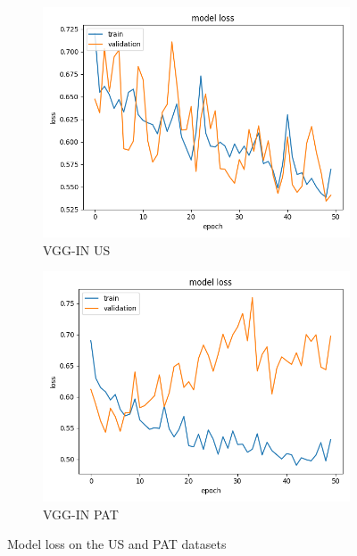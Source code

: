 \begin{figure}
\begin{subfigure}[b]{.45\linewidth}
\includegraphics[width=\linewidth]{Figs/vgg_in_us_loss.jpg}
\caption{VGG-IN US}
\end{subfigure}
\begin{subfigure}[b]{.45\linewidth}
\includegraphics[width=\linewidth]{Figs/vgg_in_pat_loss.jpg}
\caption{VGG-IN PAT}
\end{subfigure}
\caption{Model loss on the US and PAT datasets}
\label{fig:loss}
\end{figure}

